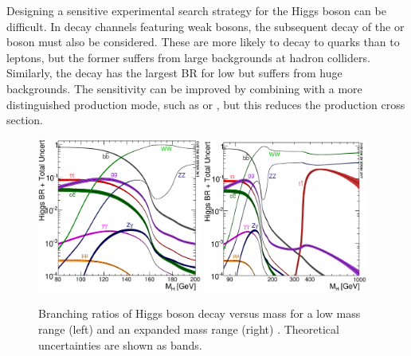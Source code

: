 Designing a sensitive experimental search strategy for the Higgs boson can be difficult. 
In decay channels featuring weak bosons, the subsequent decay of the \PW or \PZ boson must 
also be considered. These are more likely to decay to quarks than to leptons, but the 
former suffers from large backgrounds at hadron colliders. Similarly, the 
\HepProcess{\Pbottom \APbottom} decay has the largest BR for low \mH but suffers from 
huge backgrounds. The sensitivity can be improved by combining with a more distinguished 
production mode, such as \WH or \ZH, but this reduces the production cross section.

\begin{figure}[t]
	\includegraphics[width=0.48\textwidth]{tex/motivation/BR_lowrange}
	\hfill
	\includegraphics[width=0.48\textwidth]{tex/motivation/BR_fullrange}
	\caption{Branching ratios of Higgs boson decay versus mass for a low mass range (left) 
	and an expanded mass range (right) \cite{YR3}. Theoretical uncertainties are shown as 
	bands.}
	\label{fig:higgs_br}
\end{figure}
